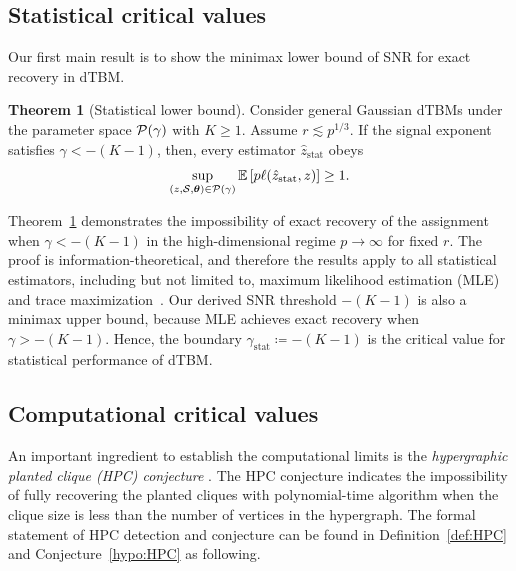 \documentclass[lettersize,onecolumn,journal]{IEEEtran}
\theoremstyle{definition}
\newtheorem{thm}{Theorem}
\theoremstyle{definition}
\def\fixme#1#2{\textbf{\color{red}[FIXME (#1): #2]}}
\begin{document}
\subsection{Statistical critical values}\label{sec:statlimit}
Our first main result is to show the minimax lower bound of SNR for exact recovery in dTBM. 
\begin{thm}[Statistical lower bound]\label{thm:stats} Consider general Gaussian dTBMs under the parameter space $\mathcal{P}(\gamma)$ with $K\geq 1$. Assume $r \lesssim p^{1/3}$. If the signal exponent satisfies $\gamma < -(K-1)$, then, every estimator $\hat z_{\text{stat}}$ obeys
\begin{equation}
    \sup_{(z, \mathcal{S}, \boldsymbol{\theta}) \in \mathcal{P}(\gamma)} \mathbb{E} \left[ p\ell(\hat z_{\text{stat}}, z) \right]\geq 1.
\end{equation}
\end{thm}
Theorem~\ref{thm:stats} demonstrates the impossibility of exact recovery of the assignment when $\gamma < -(K-1)$ in the high-dimensional regime $p\to \infty$ for fixed $r$. The proof is information-theoretical, and therefore the results apply to all statistical estimators, including but not limited to, maximum likelihood estimation (MLE)~\citep{wang2019multiway} and trace maximization~\citep{ghoshdastidar2017uniform}. Our derived SNR threshold $-(K-1)$ is also a minimax upper bound, because MLE achieves exact recovery when $\gamma > -(K-1)$. Hence, the boundary $\gamma_{\text{stat}} \coloneqq -(K-1)$ is the  critical value for statistical performance of dTBM. 


\subsection{Computational critical values}\label{sec:complimit}
An important ingredient to establish the computational limits is the \emph{hypergraphic planted clique (HPC) conjecture} \citep{zhang2018tensor, brennan2020reducibility}. The HPC conjecture indicates the impossibility of fully recovering the planted cliques with polynomial-time algorithm when the clique size is less than the number of vertices in the hypergraph.
The formal statement of HPC detection and conjecture can be found in Definition~\ref{def:HPC} and Conjecture~\ref{hypo:HPC} as following.  
\end{document}
